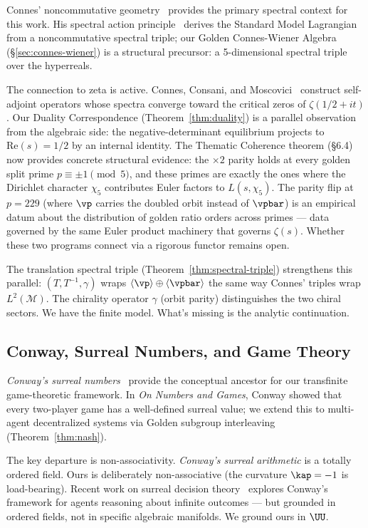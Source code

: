 Connes' noncommutative geometry~\cite{connes} provides the primary spectral context for this work. His spectral action principle~\cite{connes-marcolli} derives the Standard Model Lagrangian from a noncommutative spectral triple; our Golden Connes-Wiener Algebra (\S\ref{sec:connes-wiener}) is a structural precursor: a 5-dimensional spectral triple over the hyperreals.

The connection to zeta is active. Connes, Consani, and Moscovici~\cite{connes-consani-zeta} construct self-adjoint operators whose spectra converge toward the critical zeros of $\zeta(1/2 + it)$. Our Duality Correspondence (Theorem~\ref{thm:duality}) is a parallel observation from the algebraic side: the negative-determinant equilibrium projects to $\mathrm{Re}(s) = 1/2$ by an internal identity. The Thematic Coherence theorem (\S6.4) now provides concrete structural evidence: the $\times 2$ parity holds at every golden split prime $p \equiv \pm 1 \pmod{5}$, and these primes are exactly the ones where the Dirichlet character $\chi_5$ contributes Euler factors to $L(s, \chi_5)$. The parity flip at $p = 229$ (where $\vp$ carries the doubled orbit instead of $\vpbar$) is an empirical datum about the distribution of golden ratio orders across primes --- data governed by the same Euler product machinery that governs $\zeta(s)$. Whether these two programs connect via a rigorous functor remains open.

The translation spectral triple (Theorem~\ref{thm:spectral-triple}) strengthens this parallel: $(T, T^{-1}, \gamma)$ wraps $\langle\vp\rangle \oplus \langle\vpbar\rangle$ the same way Connes' triples wrap $L^2(\mathcal{M})$. The chirality operator $\gamma$ (orbit parity) distinguishes the two chiral sectors. We have the finite model. What's missing is the analytic continuation.

\subsection*{Conway, Surreal Numbers, and Game Theory}

\emph{Conway's surreal numbers}~\cite{conway,knuth-surreal} provide the conceptual ancestor for our transfinite game-theoretic framework. In \emph{On Numbers and Games}, Conway showed that every two-player game has a well-defined surreal value; we extend this to multi-agent decentralized systems via Golden subgroup interleaving (Theorem~\ref{thm:nash}).

The key departure is non-associativity. \emph{Conway's surreal arithmetic} is a totally ordered field. Ours is deliberately non-associative (the curvature $\kap = -1$ is load-bearing). Recent work on surreal decision theory~\cite{bostrom-surreal} explores Conway's framework for agents reasoning about infinite outcomes --- but grounded in ordered fields, not in specific algebraic manifolds. We ground ours in $\UU$.


